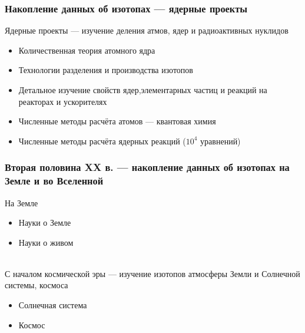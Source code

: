 \begin{frame}
\frametitle{Накопление данных об изотопах --- ядерные проекты}


Ядерные проекты --- изучение деления атмов, ядер и радиоактивных нуклидов
\begin{itemize}
	\item Количественная теория атомного ядра
	\item Технологии разделения и производства изотопов
	\item Детальное изучение свойств ядер,элементарных частиц и реакций на реакторах и ускорителях
	\item Численные методы расчёта атомов --- квантовая химия
	\item Численные методы расчёта ядерных реакций ($10^4$ уравнений)
\end{itemize}

\end{frame}


\begin{frame}
\frametitle{Вторая половина XX в. --- накопление данных об изотопах на Земле и во Вселенной}
На Земле
\begin{itemize}
	\item Науки о Земле
	\item Науки о живом
\end{itemize}

~\\
С началом космической эры --- изучение изотопов атмосферы Земли и Солнечной системы, космоса
\begin{itemize}
	\item Солнечная система
	\item Космос
\end{itemize}	

\end{frame}

